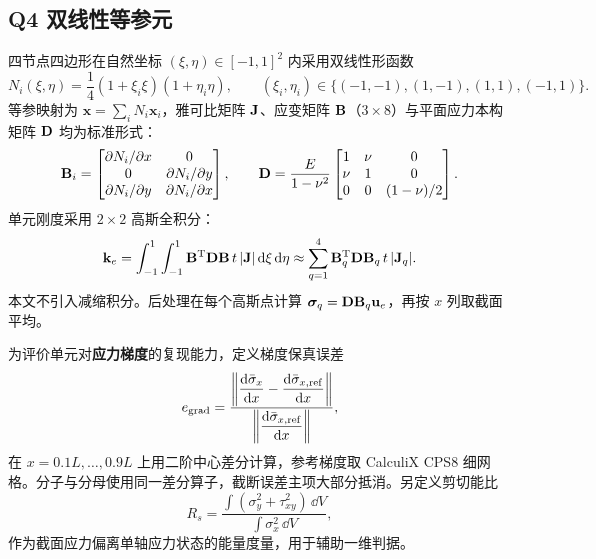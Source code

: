 \subsection{Q4 双线性等参元}

四节点四边形在自然坐标 $(\xi,\eta)\in[-1,1]^2$ 内采用双线性形函数
\begin{equation}
  N_i(\xi,\eta)=\frac14(1+\xi_i\xi)(1+\eta_i\eta),\qquad
  (\xi_i,\eta_i)\in\{(-1,-1),(1,-1),(1,1),(-1,1)\}.
\end{equation}
等参映射为 $\mathbf{x}=\sum_iN_i\mathbf{x}_i$，雅可比矩阵 $\mathbf{J}$、应变矩阵 $\mathbf{B}$（$3\times8$）与平面应力本构矩阵 $\mathbf{D}$ 均为标准形式：
\begin{equation}
  \mathbf{B}_i=\begin{bmatrix}
    \partial N_i/\partial x & 0\\
    0 & \partial N_i/\partial y\\
    \partial N_i/\partial y & \partial N_i/\partial x
  \end{bmatrix},\qquad
  \mathbf{D}=\frac{E}{1-\nu^2}
  \begin{bmatrix}
    1 & \nu & 0\\
    \nu & 1 & 0\\
    0 & 0 & (1-\nu)/2
  \end{bmatrix}.
\end{equation}
单元刚度采用 $2\times2$ 高斯全积分：
\begin{equation}
  \mathbf{k}_e=\int_{-1}^{1}\int_{-1}^{1}\mathbf{B}^{\mathrm T}\mathbf{D}\mathbf{B}\,t\,|\mathbf{J}|\,\mathrm{d}\xi\,\mathrm{d}\eta
      \approx\sum_{q=1}^{4}\mathbf{B}_q^{\mathrm T}\mathbf{D}\mathbf{B}_q\,t\,|\mathbf{J}_q|.
  \label{eq:q4-ke}
\end{equation}
本文不引入减缩积分。后处理在每个高斯点计算 $\boldsymbol{\sigma}_q=\mathbf{D}\mathbf{B}_q\mathbf{u}_e$，再按 $x$ 列取截面平均。

为评价单元对\textbf{应力梯度}的复现能力，定义梯度保真误差
\begin{equation}
  e_{\rm grad}=
  \frac{\left\|\dfrac{\mathrm{d}\bar{\sigma}_x}{\mathrm{d} x}-\dfrac{\mathrm{d}\bar{\sigma}_{x,\rm ref}}{\mathrm{d} x}\right\|}
       {\left\|\dfrac{\mathrm{d}\bar{\sigma}_{x,\rm ref}}{\mathrm{d} x}\right\|},
  \label{eq:egrad}
\end{equation}
在 $x=0.1L,\ldots,0.9L$ 上用二阶中心差分计算，参考梯度取 CalculiX CPS8 细网格。分子与分母使用同一差分算子，截断误差主项大部分抵消。另定义剪切能比
\begin{equation}
  R_s=\frac{\int(\sigma_y^2+\tau_{xy}^2)\,\dd V}{\int\sigma_x^2\,\dd V},
  \label{eq:Rs}
\end{equation}
作为截面应力偏离单轴应力状态的能量度量，用于辅助一维判据。


